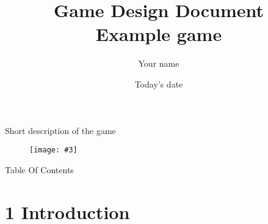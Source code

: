 \documentclass{article}
\begin{document}
\date{Today's date}
\author{Your name}
\newcommand{\gameName}{Example game}
\newcommand{\shortDescription}{Short description of the game}

\newcommand{\I}[1][1]{#1 Introduction}
\newcommand{\Ia}[1][1.1]{#1 Concept}
\newcommand{\Ib}[1][1.2]{#1 Look and feel}
\newcommand{\Ic}[1][1.3]{#1 Genres}
\newcommand{\Id}[1][1.4]{#1 Target audience}
\newcommand{\Ie}[1][1.5]{#1 Unique selling points}
\newcommand{\II}[1][2]{#1 Product design}
\newcommand{\IIa}[1][2.1]{#1 Gameplay}
\newcommand{\IIb}[1][2.2]{#1 Mechanics}
\newcommand{\IIc}[1][2.6]{#1 Core loops}
\newcommand{\IId}[1][2.7]{#1 Graphics}
\newcommand{\IIe}[1][2.8]{#1 Audio}
\newcommand{\IIf}[1][2.9]{#1 Monetization}
\newcommand{\III}[1][3]{#1 Story and narrative}
\newcommand{\IIIa}[1][3.1]{#1 Backstory}
\newcommand{\IIIb}[1][3.2]{#1 Plot elements}
\newcommand{\IIIc}[1][3.3]{#1 Game progression}
\newcommand{\IIId}[1][3.4]{#1 Characters}

\newcommand{\image}[3][!h]
{
	\begin{figure}[#1]
	\begin{center}\texttt{[image: \#3]}\end{center}
	\end{figure}
}

\newcommand{\segment}
{
	\newline\newline
}

\title{
	Game Design Document
	\\
	\vspace{7mm}
	{\huge \gameName}
}

\maketitle
\begin{center}\shortDescription\end{center}
\vspace{15mm}

\image{1.5}{chess}
\clearpage

{\huge \begin{center}Table Of Contents\end{center}}
\vspace{5mm}
\section*{\I}
\end{document}
